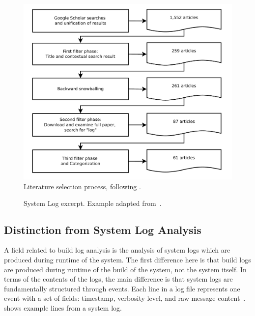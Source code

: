 \begin{figure}[tb]
	\centering
	\includegraphics[width=\columnwidth, clip]{img/lit_survey.pdf}
	\caption{Literature selection process, following
	\cite{petersen2015guidelines}.}
	\label{fig:lit-survey}
\end{figure}


\begin{figure}[b]
  \centering
  
  \caption{System Log excerpt.
Example adapted from~\cite{he2017towards}.}
  \label{lst:system-log}
\end{figure}

\subsection{Distinction from System Log Analysis}
\label{sec:system-log-analysis}
A field related to build log analysis is the analysis of system
logs which are produced during runtime of the system.
The first difference here is that build logs are produced during runtime
of the build of the system, not the system itself.
In terms of the contents of the logs, the main difference is that system
logs are fundamentally structured
through events.
Each line in a log file represents one event with a
set of fields: timestamp, verbosity level, and raw message
content~\cite{he2017towards}.
 shows
example lines from a system log.


